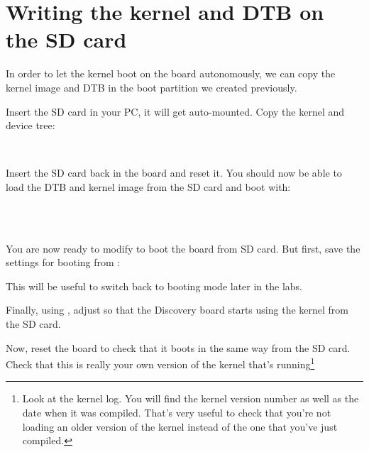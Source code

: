 \section{Writing the kernel and DTB on the SD card}

In order to let the kernel boot on the board autonomously, we can
copy the kernel image and DTB in the boot partition we created
previously.

Insert the SD card in your PC, it will get auto-mounted. Copy the
kernel and device tree:

\small
{}\\
\normalsize

Insert the SD card back in the board and reset it. You should now be
able to load the DTB and kernel image from the SD card and boot with:

\\
\\

You are now ready to modify  to boot the board
from SD card. But first, save the settings for booting from
:


This will be useful to switch back to  booting mode
later in the labs.

Finally, using , adjust  so that
the Discovery board starts using the kernel from the SD card.

Now, reset the board to check that it boots in the same way from the
SD card. Check that this is really your own version of the kernel
that's running\footnote{Look at the kernel log. You will find the
kernel version number as well as the date when it was compiled.
That's very useful to check that you're not loading an older version
of the kernel instead of the one that you've just compiled.}

